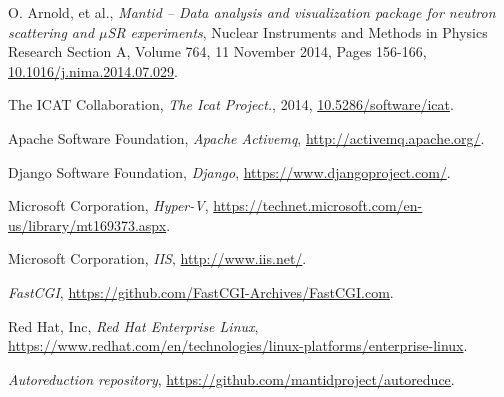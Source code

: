 \documentclass[twocolumn]{article}
\begin{document}
\begin{thebibliography}{99}
    O. Arnold, et al.,
    \emph{Mantid -- Data analysis and visualization package for neutron scattering and $\mu$SR experiments},
    Nuclear Instruments and Methods in Physics Research Section A, Volume 764, 11 November 2014, Pages 156-166,
    \href{http://dx.doi.org/10.1016/j.nima.2014.07.029}{10.1016/j.nima.2014.07.029}.
    
    The ICAT Collaboration,
    \emph{The Icat Project.},
    2014,
    \href{https://doi.org/10.5286/SOFTWARE/ICAT}{10.5286/software/icat}.
    
    Apache Software Foundation,
    \emph{Apache Activemq},
    \url{http://activemq.apache.org/}.
    
    Django Software Foundation,
    \emph{Django},
    \url{https://www.djangoproject.com/}.
    
    Microsoft Corporation,
    \emph{Hyper-V},
    \url{https://technet.microsoft.com/en-us/library/mt169373.aspx}.
    
    Microsoft Corporation,
    \emph{IIS},
    \url{http://www.iis.net/}.
    
    \emph{FastCGI},
    \url{https://github.com/FastCGI-Archives/FastCGI.com}.
    
    Red Hat, Inc,
    \emph{Red Hat Enterprise Linux},
    \url{https://www.redhat.com/en/technologies/linux-platforms/enterprise-linux}.
    
    \emph{Autoreduction repository},
    \url{https://github.com/mantidproject/autoreduce}.

    
\end{thebibliography}
\end{document}
